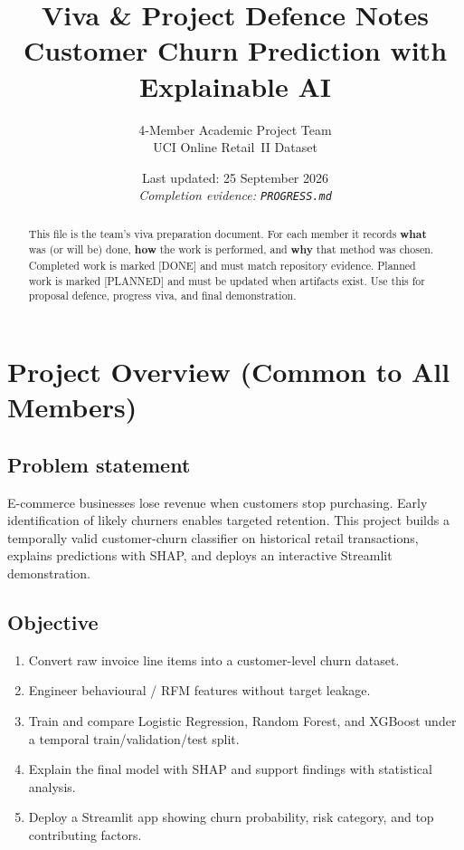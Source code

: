 \documentclass[11pt,a4paper]{article}
\title{\textbf{Viva \& Project Defence Notes}\\[0.35em]
\large Customer Churn Prediction with Explainable AI}
\author{4-Member Academic Project Team\\
UCI Online Retail~II Dataset}
\date{Last updated: 25 September 2026\\
\textit{Completion evidence: \texttt{PROGRESS.md}}}
\newcommand{\done}{[DONE]}
\newcommand{\planned}{[PLANNED]}
\begin{document}
\maketitle

\begin{abstract}
This file is the team's viva preparation document. For each member it records
\textbf{what} was (or will be) done, \textbf{how} the work is performed, and
\textbf{why} that method was chosen. Completed work is marked \done{} and must
match repository evidence. Planned work is marked \planned{} and must be updated
when artifacts exist. Use this for proposal defence, progress viva, and final
demonstration.
\end{abstract}

\tableofcontents
\newpage

\section{Project Overview (Common to All Members)}

\subsection{Problem statement}
E-commerce businesses lose revenue when customers stop purchasing. Early
identification of likely churners enables targeted retention. This project
builds a temporally valid customer-churn classifier on historical retail
transactions, explains predictions with SHAP, and deploys an interactive
Streamlit demonstration.

\subsection{Objective}
\begin{enumerate}
  \item Convert raw invoice line items into a customer-level churn dataset.
  \item Engineer behavioural / RFM features without target leakage.
  \item Train and compare Logistic Regression, Random Forest, and XGBoost
        under a temporal train/validation/test split.
  \item Explain the final model with SHAP and support findings with statistical
        analysis.
  \item Deploy a Streamlit app showing churn probability, risk category, and
        top contributing factors.
\end{enumerate}
\end{document}
